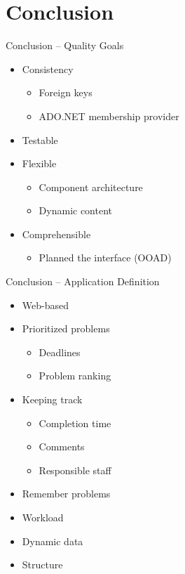 \section*{Conclusion}
\begin{frame}{Conclusion -- Quality Goals}

\begin{itemize}
	\item Consistency
	\begin{itemize}
		\item Foreign keys
		\item ADO.NET membership provider
	\end{itemize}
	\item<2-> Testable 
	\item<3-> Flexible
	\begin{itemize}
		\item Component architecture
		\item Dynamic content
	\end{itemize}
	\item<4-> Comprehensible
	\begin{itemize}
		\item Planned the interface (OOAD)
	\end{itemize}
\end{itemize}
\end{frame}

\begin{frame}{Conclusion -- Application Definition}

	\begin{itemize}
	\item Web-based 
	\item<2-> Prioritized problems
	\begin{itemize}
		\item<2-> Deadlines
		\item<2-> Problem ranking
	\end{itemize}
	\item<3-> Keeping track
	\begin{itemize}
		\item<3-> Completion time
		\item<3-> Comments
		\item<3-> Responsible staff
	\end{itemize}	
	\item<4-> Remember problems
	\item<5-> Workload
	\item<6-> Dynamic data
	\item<7-> Structure
\end{itemize}
\end{frame}